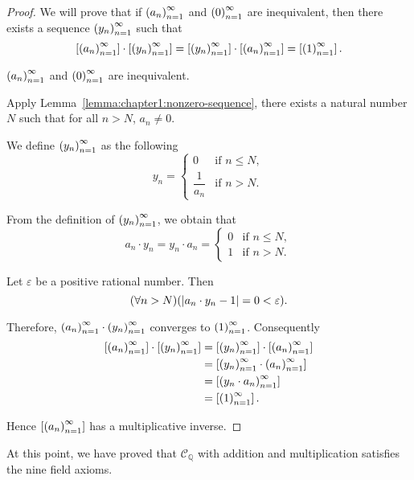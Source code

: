 \begin{proof}
    We will prove that if ${\left({a_{n}}\right)}^{\infty}_{n=1}$ and ${\left({0}\right)}^{\infty}_{n=1}$ are inequivalent, then there exists a sequence ${\left({y_{n}}\right)}^{\infty}_{n=1}$ such that
    \[
        \left[{{\left({a_{n}}\right)}^{\infty}_{n=1}}\right]\cdot\left[{{\left({y_{n}}\right)}^{\infty}_{n=1}}\right] = \left[{{\left({y_{n}}\right)}^{\infty}_{n=1}}\right]\cdot\left[{{\left({a_{n}}\right)}^{\infty}_{n=1}}\right] = \left[{{\left({1}\right)}^{\infty}_{n=1}}\right].
    \]

    ${\left({a_{n}}\right)}^{\infty}_{n=1}$ and ${\left({0}\right)}^{\infty}_{n=1}$ are inequivalent.

    Apply Lemma~\ref{lemma:chapter1:nonzero-sequence}, there exists a natural number $N$ such that for all $n > N$, $a_{n}\ne 0$.

    We define ${\left({y_{n}}\right)}^{\infty}_{n=1}$ as the following
    \[
        y_{n} = \begin{cases}
            0                & \text{if $n\le N$}, \\
            \dfrac{1}{a_{n}} & \text{if $n > N$}.
        \end{cases}
    \]

    From the definition of ${\left({y_{n}}\right)}^{\infty}_{n=1}$, we obtain that
    \[
        a_{n}\cdot y_{n} = y_{n}\cdot a_{n} = \begin{cases}
            0 & \text{if $n\le N$}, \\
            1 & \text{if $n > N$}.
        \end{cases}
    \]

    Let $\varepsilon$ be a positive rational number. Then
    \[
        (\forall n > N)(\left\vert{a_{n}\cdot y_{n} - 1}\right\vert = 0 < \varepsilon).
    \]

    Therefore, ${\left({a_{n}}\right)}^{\infty}_{n=1}\cdot {\left({y_{n}}\right)}^{\infty}_{n=1}$ converges to ${\left({1}\right)}^{\infty}_{n=1}$. Consequently
    \begin{align*}
        \left[{{\left({a_{n}}\right)}^{\infty}_{n=1}}\right]\cdot\left[{{\left({y_{n}}\right)}^{\infty}_{n=1}}\right] & = \left[{{\left({y_{n}}\right)}^{\infty}_{n=1}}\right]\cdot\left[{{\left({a_{n}}\right)}^{\infty}_{n=1}}\right] \\
                                                    & = \left[{{\left({y_{n}}\right)}^{\infty}_{n=1}\cdot{\left({a_{n}}\right)}^{\infty}_{n=1}}\right]         \\
                                                    & = \left[{{\left({y_{n}\cdot a_{n}}\right)}^{\infty}_{n=1}}\right]              \\
                                                    & = \left[{{\left({1}\right)}^{\infty}_{n=1}}\right].
    \end{align*}

    Hence $\left[{{\left({a_{n}}\right)}^{\infty}_{n=1}}\right]$ has a multiplicative inverse.
\end{proof}

At this point, we have proved that $\mathscr{C}_{\mathbb{Q}}$ with addition and multiplication satisfies the nine field axioms.

